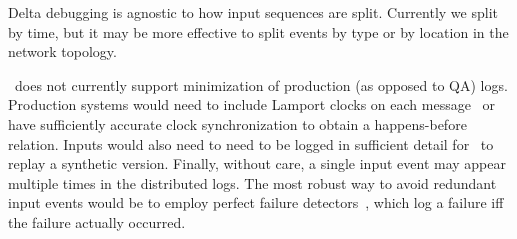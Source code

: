 
 Delta debugging is agnostic to how
input sequences are split. Currently we
split by time, but it may be more effective to split events by type or by location in the network
topology.%

 \projectname~does
not currently support minimization of production (as opposed
to QA) logs. Production systems would need to include Lamport
clocks on each message~\cite{Lamport:1978:TCO:359545.359563} or have
sufficiently accurate clock synchronization to obtain a happens-before
relation. Inputs would also
need to need to be logged in sufficient detail for \projectname~to
replay a synthetic version. Finally, without care, a single
input event may appear multiple times in the
distributed logs. The most robust way to
avoid redundant input events would be to employ perfect failure
detectors~\cite{chandra1996unreliable}, which log a failure iff
the failure actually occurred.

